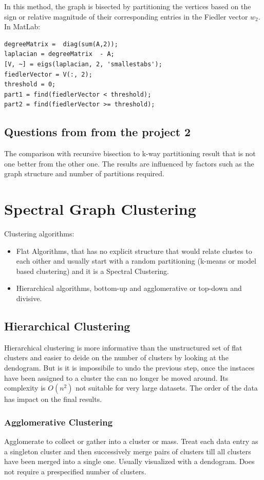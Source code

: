 \documentclass[unicode,11pt,a4paper,oneside,numbers=endperiod,openany]{scrartcl}
\begin{document}
In this method, the graph is bisected by partitioning the vertices based on the sign or relative magnitude of their corresponding entries in the Fiedler vector \( w_2 \).
\newline
In MatLab:
\begin{lstlisting}
degreeMatrix =  diag(sum(A,2));
laplacian = degreeMatrix  - A;
[V, ~] = eigs(laplacian, 2, 'smallestabs');
fiedlerVector = V(:, 2);
threshold = 0;
part1 = find(fiedlerVector < threshold);
part2 = find(fiedlerVector >= threshold);
\end{lstlisting}

\subsection{Questions from from the project 2}
The comparison with recursive bisection to k-way partitioning result that is not one better from the other one. The results are influenced by factors such as the graph structure and number of partitions required.

\section{Spectral Graph Clustering}
Clustering algorithms:
\begin{itemize}
 \item{Flat Algorithms, that has no explicit structure that would relate clustes to each oither and usually start with a random partitioning (k-means or model based clustering) and it is a Spectral Clustering.}
 \item{Hierarchical algorithms, bottom-up and agglomerative or top-down and divisive.}
\end{itemize}

\subsection{Hierarchical Clustering}
Hierarchical clustering is more informative than the unstructured set of flat clusters and easier to deide on the number of clusters by looking at the dendogram.\newline
But is it is impossibile to undo the previous step, once the instaces have been assigned to a cluster the can no longer be moved around. Its complexity is $O(n^2)$ not suitable for very large datasets. The order of the data has impact on the final results.
\subsubsection{Agglomerative Clustering}
Agglomerate to collect or gather into a cluster or mass. Treat each data entry as a singleton cluster and then successively merge pairs of clusters till all clusters have been merged into a single one. Usually visualized with a dendogram. Does not require a prespecified number of clusters.
\end{document}

